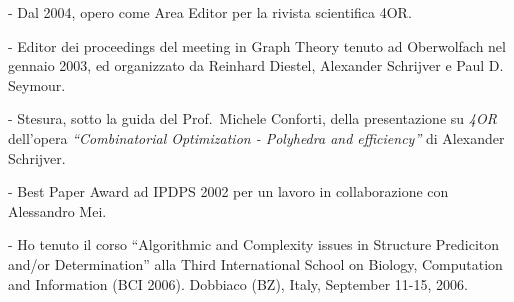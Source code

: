 %
%
%
%



\vspace{1.8mm}


   - Dal 2004, opero come Area Editor per la rivista scientifica 4OR.

   - Editor dei proceedings del meeting
   in Graph Theory tenuto ad Oberwolfach nel gennaio 2003,
   ed organizzato da Reinhard Diestel, Alexander Schrijver
   e Paul D. Seymour.

   - Stesura, sotto la guida del Prof.~Michele Conforti,
   della presentazione su {\em 4OR} dell'opera
   {\em ``Combinatorial Optimization
              - Polyhedra and efficiency''}
   di Alexander Schrijver.

   - Best Paper Award ad IPDPS 2002
     per un lavoro in collaborazione con Alessandro Mei.

   - Ho tenuto il corso
    ``Algorithmic and Complexity issues in Structure Prediciton and/or Determination''
     alla Third International School on Biology,
     Computation and Information (BCI 2006).
     Dobbiaco (BZ), Italy, September 11-15, 2006.

